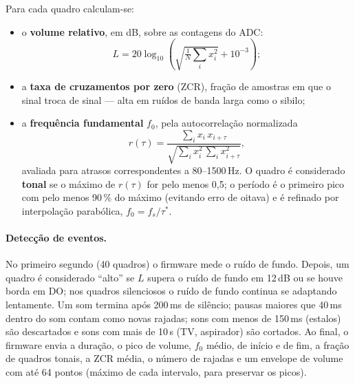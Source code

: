 Para cada quadro calculam-se:
\begin{itemize}
  \item o \textbf{volume relativo}, em dB, sobre as contagens do ADC:
  \begin{equation}
    L = 20\log_{10}\!\left(\sqrt{\tfrac{1}{N}\textstyle\sum_{i} x_i^2} + 10^{-3}\right);
    \label{eq:rms}
  \end{equation}
  \item a \textbf{taxa de cruzamentos por zero} (ZCR), fração de amostras em que o sinal troca de sinal --- alta em ruídos de banda larga como o sibilo;
  \item a \textbf{frequência fundamental} $f_0$, pela autocorrelação normalizada
  \begin{equation}
    r(\tau) = \frac{\sum_i x_i\,x_{i+\tau}}{\sqrt{\sum_i x_i^2 \,\sum_i x_{i+\tau}^2}},
    \label{eq:autocorr}
  \end{equation}
  avaliada para atrasos correspondentes a 80--1500\,Hz. O quadro é considerado \textbf{tonal} se o máximo de $r(\tau)$ for pelo menos 0,5; o período é o primeiro pico com pelo menos 90\,\% do máximo (evitando erro de oitava) e é refinado por interpolação parabólica, $f_0 = f_s/\tau^*$.
\end{itemize}

\paragraph{Detecção de eventos.}
No primeiro segundo (40 quadros) o firmware mede o ruído de fundo. Depois, um quadro é considerado ``alto'' se $L$ supera o ruído de fundo em 12\,dB ou se houve borda em DO; nos quadros silenciosos o ruído de fundo continua se adaptando lentamente. Um som termina após 200\,ms de silêncio; pausas maiores que 40\,ms dentro do som contam como novas rajadas; sons com menos de 150\,ms (estalos) são descartados e sons com mais de 10\,s (TV, aspirador) são cortados. Ao final, o firmware envia a duração, o pico de volume, $f_0$ médio, de início e de fim, a fração de quadros tonais, a ZCR média, o número de rajadas e um envelope de volume com até 64 pontos (máximo de cada intervalo, para preservar os picos).

